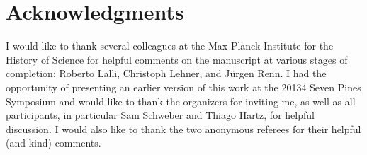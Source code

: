 \documentclass[12pt,a4paper]{article}
\begin{document}
\section{Acknowledgments}
I would like to thank several colleagues at the Max Planck Institute for the History of Science for helpful comments on the manuscript at various stages of completion: Roberto Lalli, Christoph Lehner, and J\"{u}rgen Renn. I had the opportunity of presenting an earlier version of this work at the 20134 Seven Pines Symposium and would like to thank the organizers for inviting me, as well as all participants, in particular Sam Schweber and Thiago Hartz, for helpful discussion. I would also like to thank the two anonymous referees for their helpful (and kind) comments. 





\end{document}
